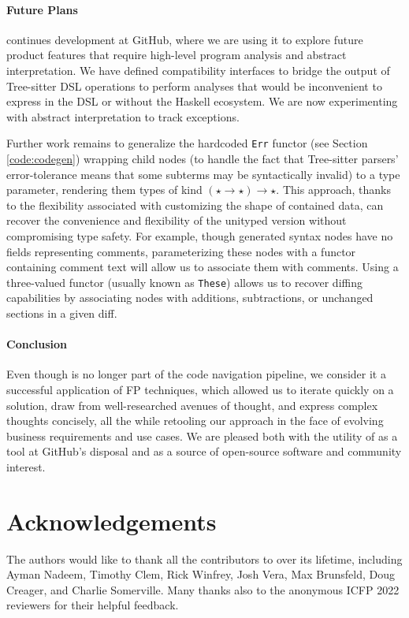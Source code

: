 \documentclass[acmsmall,fleqn]{acmart}
\begin{document}
\paragraph{Future Plans}
%
\semantic{} continues development at GitHub, where we are using it to explore
future product features that require high-level program analysis and abstract
interpretation. We have defined compatibility interfaces to bridge
the output of Tree-sitter DSL operations to perform analyses that would be
inconvenient to express in the DSL or without the Haskell ecosystem. We are
now experimenting with abstract interpretation to track exceptions.


Further work remains to generalize the hardcoded \texttt{Err} functor (see
Section \ref{code:codegen}) wrapping child nodes (to handle the fact that Tree-sitter
parsers' error-tolerance means that some subterms may be syntactically invalid)
to a type parameter, rendering them types of kind
$(\star \rightarrow \star) \rightarrow \star $. This approach, thanks to the
flexibility associated with customizing the shape of contained data, can recover
the convenience and flexibility of the unityped version without compromising
type safety. For example, though generated syntax nodes have no fields
representing comments, parameterizing these nodes with a functor containing
comment text will allow us to associate them with comments. Using a three-valued
functor (usually known as \texttt{These}) allows us to recover diffing
capabilities by associating nodes with additions, subtractions, or unchanged
sections in a given diff.

\paragraph{Conclusion}
Even though \semantic{} is no longer part of the code navigation pipeline, we
consider it a successful application of FP techniques, which allowed us to
iterate quickly on a solution, draw from well-researched avenues of thought,
and express complex thoughts concisely, all the while retooling our approach in
the face of evolving business requirements and use cases. We are pleased both
with the utility of \semantic{} as a tool at GitHub’s disposal and as a source
of open-source software and community interest.

\section*{Acknowledgements}
The authors would like to thank all the contributors to \semantic{} over its
lifetime, including Ayman Nadeem, Timothy Clem, Rick Winfrey, Josh Vera, Max
Brunsfeld, Doug Creager, and Charlie Somerville. Many thanks also to the anonymous
ICFP 2022 reviewers for their helpful feedback.


\clearpage
\end{document}
